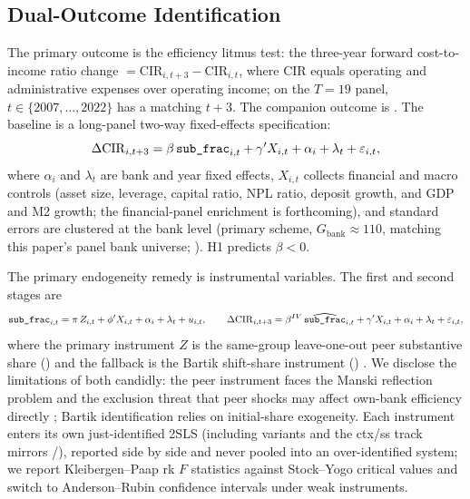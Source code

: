 \subsection{Dual-Outcome Identification}
The primary outcome is the efficiency litmus test: the three-year forward
cost-to-income ratio change 
$= \mathrm{CIR}_{i,t+3} - \mathrm{CIR}_{i,t}$, where $\mathrm{CIR}$ equals
operating and administrative expenses over operating income; on the $T=19$
panel, $t\in\{2007,\dots,2022\}$ has a matching $t+3$. The companion outcome
is . The baseline is a long-panel two-way
fixed-effects specification:
\begin{equation}
\Delta \mathrm{CIR}_{i,t+3}
 = \beta\,\texttt{sub\_frac}_{i,t}
 + \gamma' X_{i,t} + \alpha_i + \lambda_t + \varepsilon_{i,t},
\label{eq:baseline}
\end{equation}
where $\alpha_i$ and $\lambda_t$ are bank and year fixed effects, $X_{i,t}$
collects financial and macro controls (asset size, leverage, capital ratio,
NPL ratio, deposit growth, and GDP and M2 growth; the financial-panel
enrichment is forthcoming), and standard errors are clustered at the bank
level (primary scheme, $G_{\text{bank}}\approx 110$, matching this paper's
panel bank universe; ). H1
predicts $\beta<0$.

The primary endogeneity remedy is instrumental variables. The first and
second stages are
\begin{equation}
\texttt{sub\_frac}_{i,t} = \pi\, Z_{i,t} + \phi' X_{i,t}
 + \alpha_i + \lambda_t + u_{i,t}, \qquad
\Delta \mathrm{CIR}_{i,t+3} = \beta^{IV}\,
 \widehat{\texttt{sub\_frac}}_{i,t} + \gamma' X_{i,t}
 + \alpha_i + \lambda_t + \varepsilon_{i,t},
\label{eq:iv}
\end{equation}
where the primary instrument $Z$ is the same-group leave-one-out peer
substantive share () and the fallback
is the Bartik shift-share instrument ()
\parencite{learyroberts2014peer,goldsmithpinkham2020bartik}. We disclose the
limitations of both candidly: the peer instrument faces the Manski reflection
problem and the exclusion threat that peer shocks may affect own-bank
efficiency directly \parencite{manski1993reflection}; Bartik identification
relies on initial-share exogeneity. Each instrument enters its own
just-identified 2SLS (including  variants and the ctx/ss track
mirrors /), reported side by side and
never pooled into an over-identified system; we report Kleibergen--Paap rk
$F$ statistics against Stock--Yogo critical values and switch to
Anderson--Rubin confidence intervals under weak instruments.

